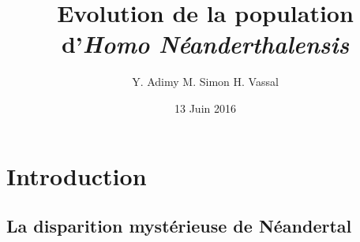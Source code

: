 \documentclass[10pt]{beamer}
\title[Population Néanderthal]{\textbf{Evolution de la population \\ d'\textit{Homo Néanderthalensis}}}
\author[Y. Adimy M. Simon H. Vassal]{Y. Adimy M. Simon H. Vassal}
\institute[]{INSA Lyon - Bioinformatique et Modélisation}
\date{13 Juin 2016}
\begin{document}

\begin{frame} 
   \titlepage
   \insertlogo
\end{frame}






\section{Introduction}
\subsection{La disparition mystérieuse de Néandertal}
\end{document}
